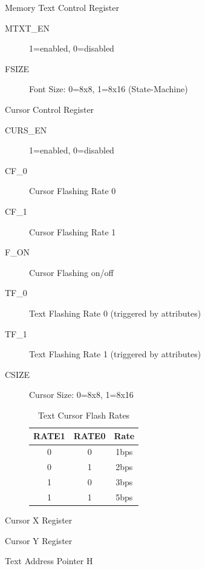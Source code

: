 \begin{description}
  \begin{samepage}
    \item[MTCR] Memory Text Control Register
      \begin{description}
      \item[MTXT\_EN] 1=enabled, 0=disabled
      \item[FSIZE] Font Size: 0=8x8, 1=8x16 (State-Machine)      
      \end{description}
  \end{samepage}
    \item[CCR] Cursor Control Register
      \begin{description}
      \item[CURS\_EN] 1=enabled, 0=disabled
      \item[CF\_0] Cursor Flashing Rate 0
      \item[CF\_1] Cursor Flashing Rate 1
      \item[F\_ON] Cursor Flashing on/off
      \item[TF\_0] Text Flashing Rate 0 (triggered by attributes)
      \item[TF\_1] Text Flashing Rate 1 (triggered by attributes)
      \item[CSIZE]  Cursor Size: 0=8x8, 1=8x16
        \begin{table}[ht]
    \begin{center}
        \begin{tabular}{|c|c|c|} \hline
            RATE1 & RATE0 & Rate \\\hline\hline
            0 & 0 & 1bps \\ \hline
            0 & 1 & 2bps \\ \hline
            1 & 0 & 3bps \\ \hline
            1 & 1 & 5bps \\ \hline
        \end{tabular}
    \end{center}
    \caption{Text Cursor Flash Rates}
    \label{tab:mtext_crsr_rates}
\end{table}
      \end{description}

    \item[CURX] Cursor X Register

    \item[CURY] Cursor Y Register

    \item[TXTH] Text Address Pointer H
      

\end{description}
